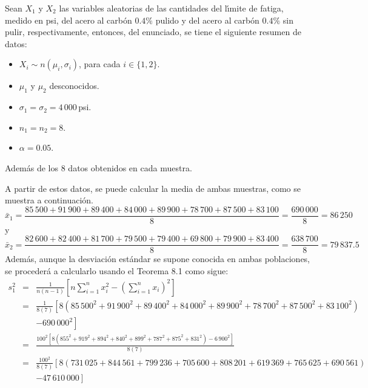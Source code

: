 \begin{solucion}
 Sean $X_1$ y $X_2$ las variables aleatorias de las cantidades del l\'{\i}mite de fatiga, medido en psi, del acero al carb\'on $0.4\%$ pulido y del acero al carb\'on $0.4\%$ sin pulir, respectivamente, entonces, del enunciado, se tiene el siguiente resumen de datos:
 \begin{itemize}
  \item $X_i \sim n\left( \mu_i, \sigma_i \right)$, para cada $i \in \{ 1,2 \}$.
  \item $\mu_1$ y $\mu_2$ desconocidos.
  \item $\sigma_1 = \sigma_2 = 4\,000\,$psi.
  \item $n_1 = n_2 = 8$.
  \item $\alpha = 0.05$.
 \end{itemize}
 Adem\'as de los 8 datos obtenidos en cada muestra.
 \par 
 A partir de estos datos, se puede calcular la media de ambas muestras, como se muestra a continuaci\'on.
 \begin{equation*}
  \bar{x}_1 = \frac{85\,500 + 91\,900 + 89\,400 + 84\,000 + 89\,900 + 78\,700 + 87\,500 + 83\,100}{8} = \frac{690\,000}{8} = 86\,250
 \end{equation*}
 y
 \begin{equation*}
  \bar{x}_2 = \frac{82\,600 + 82\,400 + 81\,700 + 79\,500 + 79\,400 + 69\,800 + 79\,900 + 83\,400}{8} = \frac{638\,700}{8} = 79\,837.5
 \end{equation*}
 Adem\'as, aunque la desviaci\'on est\'andar se supone conocida en ambas poblaciones, se proceder\'a a calcularlo usando el Teorema 8.1 como sigue:
 \begin{eqnarray*}
  s_1^2 & = & \frac{1}{n(n-1)} \left[ n\sum_{i=1}^n x_i^2 - \left( \sum_{i=1}^n x_i \right)^2 \right] \\
  & = & \frac{1}{8(7)} \left[ 8\left( 85\,500^2 + 91\,900^2 + 89\,400^2 + 84\,000^2 + 89\,900^2 + 78\,700^2 + 87\,500^2 + 83\,100^2 \right) \right. \\
  & & \left. - 690\,000^2 \right] \\
  & = & \frac{100^2\left[ 8\left( 855^2 + 919^2 + 894^2 + 840^2 + 899^2 + 787^2 + 875^2 + 831^2 \right) - 6\,900^2 \right]}{8(7)} \\
  & = & \frac{100^2}{8(7)} \left[ 8( 731\,025 + 844\,561 + 799\,236 + 705\,600 + 808\,201 + 619\,369 + 765\,625 + 690\,561) \right. \\
  & & \left. - 47\,610\,000 \right] \\

\end{eqnarray*}
\end{solucion}
